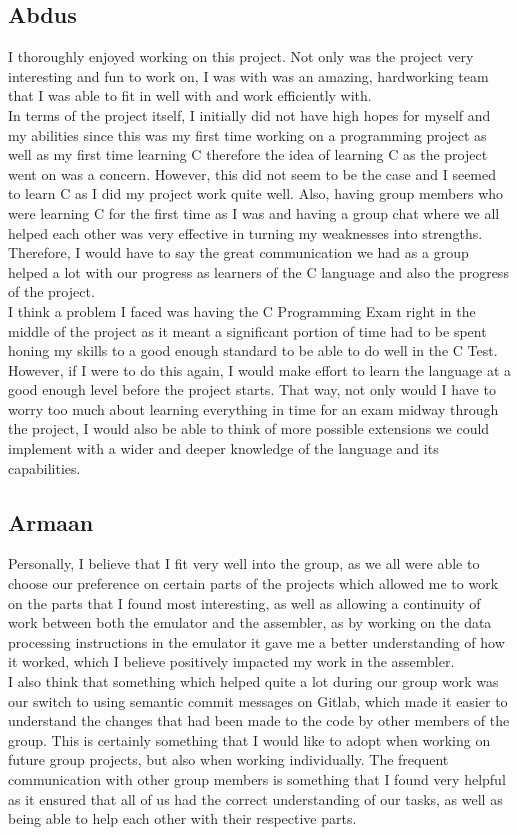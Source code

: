 \documentclass[11pt]{article}
\begin{document}
\subsection{Abdus}
I thoroughly enjoyed working on this project. Not only was the project very interesting and fun to work on, I was with was an amazing, hardworking team that I was able to fit in well with and work efficiently with. 
\\
In terms of the project itself, I initially did not have high hopes for myself and my abilities since this was my first time working on a programming project as well as my first time learning C therefore the idea of learning C as the project went on was a concern. However, this did not seem to be the case and I seemed to learn C as I did my project work quite well. Also, having group members who were learning C for the first time as I was and having a group chat where we all helped each other was very effective in turning my weaknesses into strengths. Therefore, I would have to say the great communication we had as a group helped a lot with our progress as learners of the C language and also the progress of the project. 
\\
I think a problem I faced was having the C Programming Exam right in the middle of the project as it meant a significant portion of time had to be spent honing my skills to a good enough standard to be able to do well in the C Test. However, if I were to do this again, I would make effort to learn the language at a good enough level before the project starts. That way, not only would I have to worry too much about learning everything in time for an exam midway through the project, I would also be able to think of more possible extensions we could implement with a wider and deeper knowledge of the language and its capabilities.
\subsection{Armaan}
Personally, I believe that I fit very well into the group, as we all were able to choose our preference on certain parts of the projects which allowed me to work on the parts that I found most interesting, as well as allowing a continuity of work between both the emulator and the assembler, as by working on the data processing instructions in the emulator it gave me a better understanding of how it worked, which I believe positively impacted my work in the assembler. 
\\
I also think that something which helped quite a lot during our group work was our switch to using semantic commit messages on Gitlab, which made it easier to understand the changes that had been made to the code by other members of the group. This is certainly something that I would like to adopt when working on future group projects, but also when working individually. The frequent communication with other group members is something that I found very helpful as it ensured that all of us had the correct understanding of our tasks, as well as being able to help each other with their respective parts.
\end{document}
